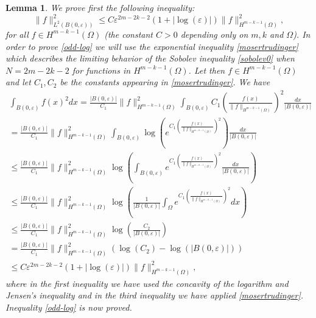 \documentclass[11pt,a4paper]{amsart}
\numberwithin{equation}{section}
\newtheorem{lemma}[equation]{Lemma}
\begin{document}
\begin{lemma}
We prove first the following inequality:
\begin{equation}\label{odd-log}
\|f\|_{L^2(B(0,\varepsilon))}^2\leq C\varepsilon^{2m-2k-2}(1+|\log(\varepsilon)|)\|f\|_{H^{m-k-1}(\Omega)}^2,
\end{equation}
for all $f\in H^{m-k-1}(\Omega)$ (the constant $C>0$ depending only on $m,k$ and $\Omega$). In order to prove \eqref{odd-log} we will use the exponential inequality  \eqref{mosertrudinger} which describes the limiting behavior of the Sobolev inequality \eqref{sobolev0} when $N=2m-2k-2$ for functions in $H^{m-k-1}(\Omega)$. Let then $f\in H^{m-k-1}(\Omega)$ and let $C_1,C_2$ be the constants appearing in \eqref{mosertrudinger}. We have
\begin{multline*}%
\int_{B(0,\varepsilon)} f(x)^2dx=\frac{|B(0,\varepsilon)|}{C_1}\|f\|_{H^{m-k-1}(\Omega)}^2\int_{B(0,\varepsilon)}C_1\left(\frac{f(x)}{\|f\|_{H^{m-k-1}(\Omega)}}\right)^2\frac{dx}{|B(0,\varepsilon)|}\\
= \frac{|B(0,\varepsilon)|}{C_1}\|f\|_{H^{m-k-1}(\Omega)}^2\int_{B(0,\varepsilon)}\log\left(e^{C_1\left(\frac{f(x)}{\|f\|_{H^{m-k-1}(\Omega)}}\right)^2}\right)\frac{dx}{|B(0,\varepsilon)|}\\
\leq \frac{|B(0,\varepsilon)|}{C_1}\|f\|_{H^{m-k-1}(\Omega)}^2\log\left(\int_{B(0,\varepsilon)}e^{C_1\left(\frac{f(x)}{\|f\|_{H^{m-k-1}(\Omega)}}\right)^2}\frac{dx}{|B(0,\varepsilon)|}\right)\\
\leq \frac{|B(0,\varepsilon)|}{C_1}\|f\|_{H^{m-k-1}(\Omega)}^2\log\left(\frac{1}{|B(0,\varepsilon)|}\int_{\Omega}e^{C_1\left(\frac{f(x)}{\|f\|_{H^{m-k-1}(\Omega)}}\right)^2}dx\right)\\
\leq \frac{|B(0,\varepsilon)|}{C_1}\|f\|_{H^{m-k-1}(\Omega)}^2\log\left(\frac{C_2}{|B(0,\varepsilon)|}\right)\\
=\frac{|B(0,\varepsilon)|}{C_1}\|f\|_{H^{m-k-1}(\Omega)}^2\left(\log(C_2)-\log(|B(0,\varepsilon)|)\right)\\
\leq C\varepsilon^{2m-2k-2}(1+|\log(\varepsilon)|) \|f\|_{H^{m-k-1}(\Omega)}^2,
\end{multline*}
where in the first inequality we have used the concavity of the logarithm and Jensen's inequality and in the third inequality we have applied \eqref{mosertrudinger}. Inequality \eqref{odd-log} is now proved.



\end{lemma}
\end{document}
